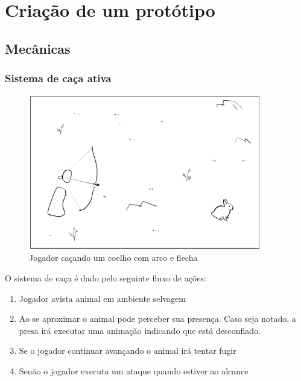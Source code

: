 \documentclass[12pt, 
openright, 
oneside, 
a4paper,    
brazil]{facom-ufu-abntex2}
\begin{document}
\iffalse
\chapter{Criação de um protótipo}

\label{sec:desenv}
\section{Mecânicas}
\subsection{Sistema de caça ativa}
\begin{figure}[H]
	\centering
	\includegraphics[width=4in]{imagens/mecanica_caca.png}
	\caption{Jogador caçando um coelho com arco e flecha}
\end{figure}
O sistema de caça é dado pelo seguinte fluxo de ações:
\begin{enumerate}  
\item Jogador avista animal em ambiente selvagem 
\item Ao se aproximar o animal pode perceber sua presença. Caso seja notado, a presa irá executar uma animação indicando que está desconfiado.
\item Se o jogador continuar avançando o animal irá tentar fugir 
\item Senão o jogador executa um ataque quando estiver ao alcance 
\end{enumerate}
\end{document}
